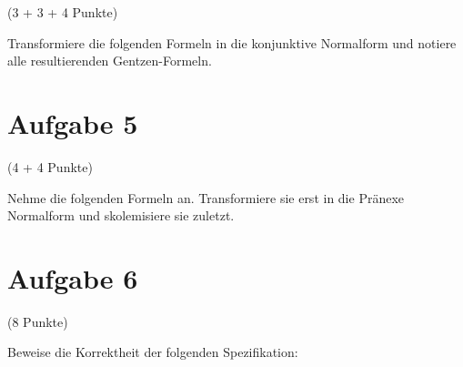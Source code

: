 \documentclass{exam}
\newcommand{\Punkte}[1]{\begin{flushright}(#1 Punkte)\end{flushright}}
\begin{document}
	\Punkte{3 + 3 + 4}
	
	Transformiere die folgenden Formeln in die konjunktive Normalform und notiere alle resultierenden Gentzen-Formeln.\\
	
	
	
	\clearpage
	\section{Aufgabe 5}
	
	\Punkte{4 + 4}
	
	Nehme die folgenden Formeln an. Transformiere sie erst in die Pränexe Normalform und skolemisiere sie zuletzt.
	
	
	
	\clearpage
	\section{Aufgabe 6}
	\Punkte{8}
	
	Beweise die Korrektheit der folgenden Spezifikation:
	
\end{document}
